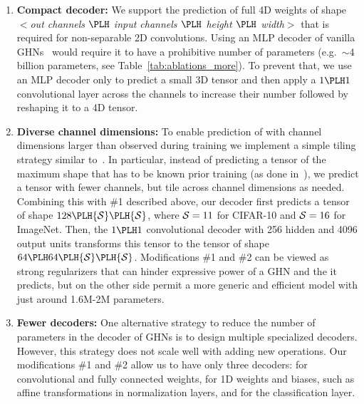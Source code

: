 \begin{enumerate}
	
	\item \textbf{Compact decoder:} We support the prediction of full 4D weights of shape $<$\textit{out channels $\PLH$ input channels $\PLH$ height $\PLH$ width}$>$	
	that is required for non-separable 2D convolutions.
	Using an MLP decoder of vanilla GHNs~\cite{zhang2018graph} would require it to have a prohibitive number of parameters (e.g.~$\sim$4 billion parameters, see Table~\ref{tab:ablations_more}).
	To prevent that, we use an MLP decoder only to predict a small 3D tensor and then apply a $1 \PLH 1$ convolutional layer across the channels to increase their number followed by reshaping it to a 4D tensor.
	
	\item  \textbf{Diverse channel dimensions:}
	To enable prediction of \params with channel dimensions larger than observed during training we implement a simple tiling strategy similar to~\cite{ha2016hypernetworks}. In particular, instead of predicting a tensor of the maximum shape that has to be known prior training (as done in~\cite{zhang2018graph}), we predict a tensor with fewer channels, but tile across channel dimensions as needed.
	Combining this with \#1 described above, our decoder first predicts a tensor of shape $128 \PLH {\cal S} \PLH {\cal S}$, where ${\cal S}=11$ for CIFAR-10 and ${\cal S}=16$ for ImageNet. Then, the $1 \PLH 1$ convolutional decoder with 256 hidden and 4096 output units transforms this tensor to the tensor of shape $64 \PLH 64 \PLH {\cal S} \PLH {\cal S}$.
	Modifications \#1 and \#2 can be viewed as strong regularizers that can hinder expressive power of a GHN and the \params it predicts, but on the other side permit a more generic and efficient model with just around 1.6M-2M parameters.
	
	\item  \textbf{Fewer decoders:} One alternative strategy to reduce the number of parameters in the decoder of GHNs is to design multiple specialized decoders. However, this strategy does not scale well with adding new operations. Our modifications \#1 and \#2 allow us to have only three decoders:
	for convolutional and fully connected weights, for 1D weights and biases, such as affine transformations in normalization layers, and for the classification layer. 
	

\end{enumerate}
